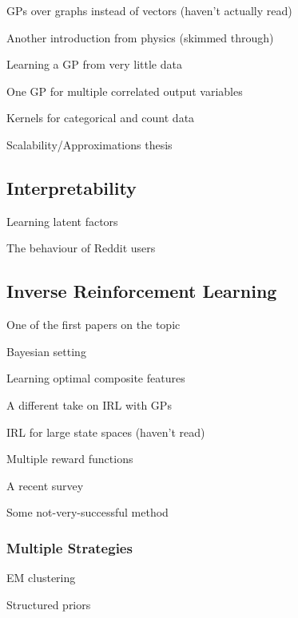 \documentclass{mprop}
\theoremstyle{definition}
\begin{document}
GPs over graphs instead of vectors (haven't actually read)
\cite{DBLP:journals/corr/abs-1803-05776}

Another introduction from physics (skimmed through) \cite{introduction_to_gps}

Learning a GP from very little data \cite{DBLP:conf/nips/PlattBSWZ01}

One GP for multiple correlated output variables \cite{DBLP:journals/jcphy/BilionisZKL13}

Kernels for categorical and count data \cite{savitsky2011variable}

Scalability/Approximations thesis \cite{kth}

\subsection{Interpretability}

Learning latent factors \cite{DBLP:conf/nips/LiSE17}

The behaviour of Reddit users \cite{DBLP:conf/atal/DasL14}

\subsection{Inverse Reinforcement Learning}

One of the first papers on the topic \cite{DBLP:conf/icml/NgR00}

Bayesian setting \cite{DBLP:conf/ijcai/RamachandranA07}

Learning optimal composite features \cite{DBLP:conf/ijcai/ChoiK13}

A different take on IRL with GPs \cite{DBLP:journals/corr/abs-1208-2112}

IRL for large state spaces (haven't read) \cite{DBLP:journals/jmlr/BoulariasKP11}

Multiple reward functions \cite{DBLP:conf/nips/ChoiK12}

A recent survey \cite{DBLP:journals/corr/abs-1806-06877}

Some not-very-successful method \cite{DBLP:conf/uai/NeuS07}

\subsubsection{Multiple Strategies}

EM clustering \cite{DBLP:conf/icml/BabesMLS11}

Structured priors \cite{DBLP:conf/ewrl/DimitrakakisR11}
\end{document}
